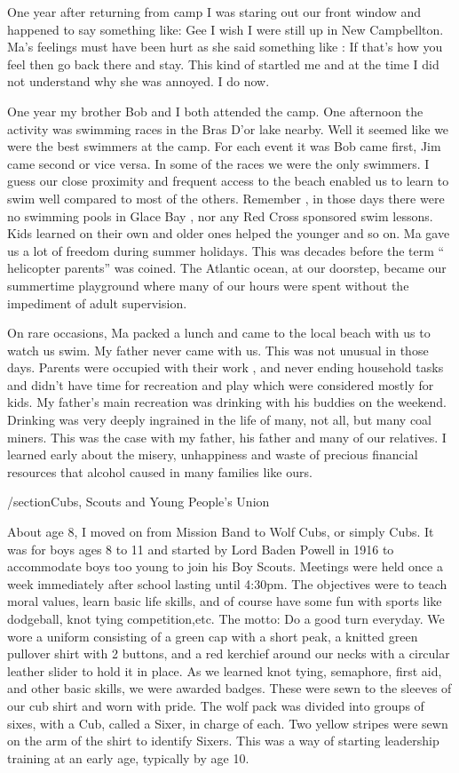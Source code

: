One year after returning from camp I was staring out our front window and happened to say something like: Gee I wish I were still up in New Campbellton. Ma's feelings must have been hurt as she said something like : If that's how you feel then go back there and stay. This kind of startled me and at the time I did not understand why she was annoyed. I do now.

One year my brother Bob and I both attended the camp. One afternoon the activity was swimming races in the Bras D'or lake nearby. Well it seemed like we were the best swimmers at the camp. For each event it was Bob came first, Jim came second or vice versa. In some of the races we were the only swimmers. I guess our close proximity and frequent access to the beach enabled us to learn to swim well compared to most of the others. Remember , in those days there were no swimming pools in Glace Bay , nor any Red Cross sponsored swim lessons. Kids learned on their own and older ones helped the younger and so on. Ma gave us a lot of freedom during summer holidays. This was decades before the term “ helicopter parents” was coined. The Atlantic ocean, at our doorstep, became our summertime playground where many of our hours were spent without the impediment of adult supervision.

On rare occasions, Ma packed a lunch and came to the local beach with us to watch us swim. My father never came with us. This was not unusual in those days. Parents were occupied with their work , and never ending household tasks and didn't have time for recreation and play which were considered mostly for kids. My father's main recreation was drinking with his buddies on the weekend. Drinking was very deeply ingrained in the life of many, not all, but many coal miners. This was the case with my father, his father and many of our relatives. I learned early about the misery, unhappiness and waste of precious financial resources that alcohol caused in many families like ours.

/section{Cubs, Scouts and Young People's Union}

About age 8, I moved on from Mission Band to Wolf Cubs, or simply Cubs. It was for boys ages 8 to 11 and started by Lord Baden Powell in 1916 to accommodate boys too young to join his Boy Scouts. Meetings were held once a week immediately after school lasting until 4:30pm. The objectives were to teach moral values, learn basic life skills, and of course have some fun with sports like dodgeball, knot tying competition,etc. The motto: Do a good turn everyday. We wore a uniform consisting of a green cap with a short peak, a knitted green pullover shirt with 2 buttons, and a red kerchief around our necks with a circular leather slider to hold it in place. As we learned knot tying, semaphore, first aid, and other basic skills, we were awarded badges. These were sewn to the sleeves of our cub shirt and worn with pride. The wolf pack was divided into groups of sixes, with a Cub, called a Sixer, in charge of each. Two yellow stripes were sewn on the arm of the shirt to identify Sixers. This was a way of starting leadership training at an early age, typically by age 10.

